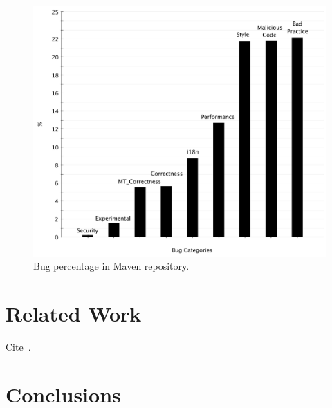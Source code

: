 \documentclass{sig-alternate}
\begin{document}
\begin{figure}[t]
	\centering
	\includegraphics[scale=0.38]{figures/bug_percent}
	\caption{Bug percentage in Maven repository.}
	\label{fig:bug-per} 
\end{figure}

\section{Related Work}
\label{sec:rel}

Cite~\cite{RDV13}.

\section{Conclusions}
\label{sec:conc}


  
\end{document}
